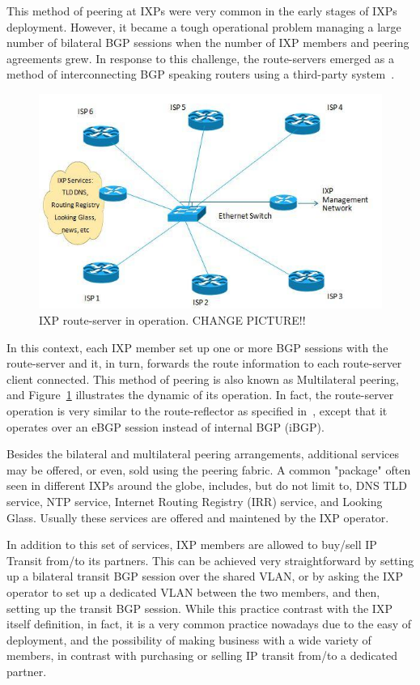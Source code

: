 \documentclass[12pt]{article}
\begin{document}
This method of peering at IXPs were very common in the early stages of IXPs deployment. However, it became a tough operational problem managing a large number of bilateral BGP sessions when the number of IXP members and peering agreements grew. In response to this challenge, the route-servers emerged as a method of interconnecting BGP speaking routers using a third-party system~\cite{rfc7947}. 

\begin{figure}
\centering
\includegraphics[scale=0.2]{imagens/route-server.jpg} 
\caption{IXP route-server in operation. CHANGE PICTURE!!}
\label{fig:routeserver}
\end{figure}

In this context, each IXP member set up one or more BGP sessions with the route-server and it, in turn, forwards the route information to each route-server client connected. This method of peering is also known as Multilateral peering, and Figure~\ref{fig:routeserver} illustrates the dynamic of its operation. In fact, the route-server operation is very similar to the route-reflector as specified in~\cite{rfc4456}, except that it operates over an eBGP session instead of internal BGP (iBGP).

Besides the bilateral and multilateral peering arrangements, additional services may be offered, or even, sold using the peering fabric. A common "package" often seen in different IXPs around the globe, includes, but do not limit to, DNS TLD service, NTP service, Internet Routing Registry (IRR) service, and Looking Glass. Usually these services are offered and maintened by the IXP operator.

In addition to this set of services, IXP members are allowed to buy/sell IP Transit from/to its partners. This can be achieved very straightforward by setting up a bilateral transit BGP session over the shared VLAN, or by asking the IXP operator to set up a dedicated VLAN between the two members, and then, setting up the transit BGP session. While this practice contrast with the IXP itself definition, in fact, it is a very common practice nowadays due to the easy of deployment, and the possibility of making business with a wide variety of members, in contrast with purchasing or selling IP transit from/to a dedicated partner. 
\end{document}
